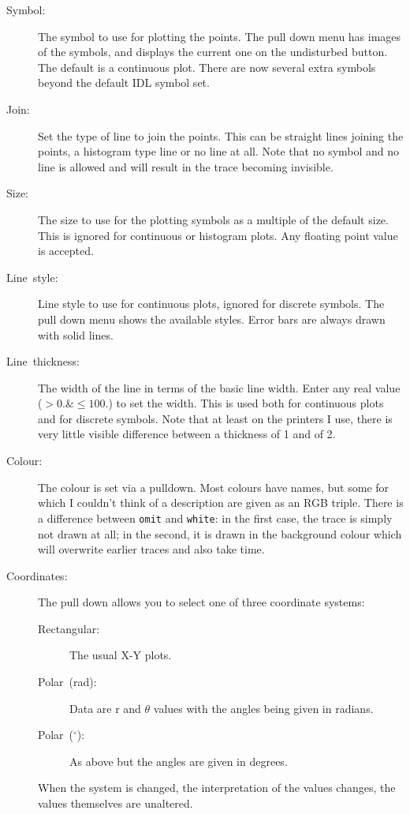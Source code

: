 \documentclass[11pt,twoside,english]{article}
\begin{document}
\begin{description}
\item [Symbol:]The symbol to use for plotting the points. The pull down
  menu has images of the symbols, and displays the current one on the
  undisturbed button. The default is a continuous plot. There are now
  several extra symbols beyond the default IDL symbol set.
\item [Join:]Set the type of line to join the points. This can be
  straight lines joining the points, a histogram type line or no line
  at all.  Note that no symbol and no line is allowed and will result
  in the trace becoming invisible.
\item [Size:]The size to use for the plotting symbols as a multiple of
  the default size. This is ignored for continuous or histogram plots.
  Any floating point value is accepted. 
\item [Line~style:]Line style to use for continuous plots, ignored for
  discrete symbols. The pull down menu shows the available
  styles. Error bars are always drawn with solid lines.
\item [Line~thickness:]The width of the line in terms of the basic line
  width. Enter any real value ($>0. \& \leq100.$) to set the width. This is used
  both for continuous plots and for discrete symbols. Note that at
  least on the printers I use, there is very little visible difference
  between a thickness of 1 and of 2.
\item [Colour:]The colour is set via a pulldown. Most colours have
  names, but some for which I couldn't think of a description are given
  as an RGB triple. There is a difference between \texttt{omit} and
  \texttt{white}: in the first case, the trace is simply not drawn at
  all; in the second, it is drawn in the background colour which will
  overwrite earlier traces and also take time.
\item [Coordinates:]The pull down allows you to select one of three
  coordinate systems:

  \begin{description}
  \item [Rectangular:]The usual X-Y plots.
  \item [Polar~(rad):]Data are $\mathrm{r}$ and $\theta$ values with
    the angles being given in radians.
  \item [Polar~($^{\circ}$):]As above but the angles are given in
    degrees.
  \end{description}
  When the system is changed, the interpretation of the values changes,
  the values themselves are unaltered.


\end{description}
\end{document}
